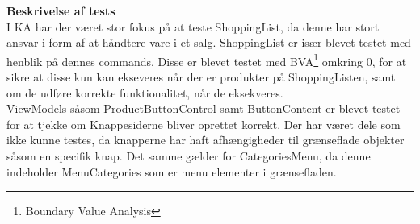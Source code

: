 \textbf{Beskrivelse af tests}\\
I \gls{KA} har der været stor fokus på at teste ShoppingList, da denne har stort ansvar i form af at håndtere vare i et salg. ShoppingList er især blevet testet med henblik på dennes commands. Disse er blevet testet med BVA\footnote{Boundary Value Analysis} omkring 0, for at sikre at disse kun kan ekseveres når der er produkter på ShoppingListen, samt om de udføre korrekte funktionalitet, når de eksekveres.\\
ViewModels såsom ProductButtonControl samt ButtonContent er blevet testet for at tjekke om Knappesiderne bliver oprettet korrekt. Der har været dele som ikke kunne testes, da knapperne har haft afhængigheder til grænseflade objekter såsom en specifik knap. Det samme gælder for CategoriesMenu, da denne indeholder MenuCategories som er menu elementer i grænsefladen.